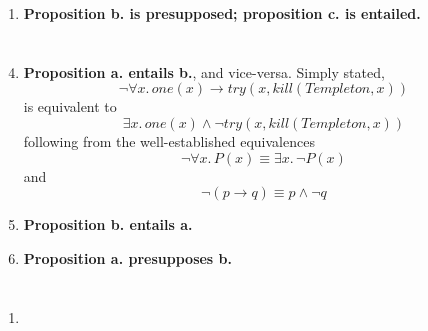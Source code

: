 \documentclass[12pt,a4paper]{article}
\begin{document}
\begin{enumerate}
\item \textbf{Proposition b. is presupposed; proposition c. is entailed.}
\end{enumerate}


\part{}
\begin{enumerate}
\setcounter{enumi}{3}
\item \textbf{Proposition a. entails b.}, and vice-versa. Simply stated,
\[
\neg \forall x.\, one(x) \rightarrow try(x, kill(Templeton, x))
\]
is equivalent to
\[
\exists x.\, one(x) \wedge \neg try(x, kill(Templeton, x))
\]
following from the well-established equivalences
\[
\neg \forall x.\, P(x) \equiv \exists x.\, \neg P(x)
\]
and
\[
\neg (p \rightarrow q) \equiv p \wedge \neg q
\]

\item \textbf{Proposition b. entails a.}

\item \textbf{Proposition a. presupposes b.}
\end{enumerate}


\part{}
\begin{enumerate}
\setcounter{enumi}{7}
\begin{enumerate}

\item 

\end{enumerate}
\end{enumerate}
\end{document}
